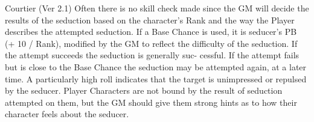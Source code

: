\begin{Chapter}{Courtier (Ver 2.1)}
Often there is no skill check made since the GM will decide the
results of the seduction based on the character’s Rank and the way the
Player describes the attempted seduction. If a Base Chance is used, it
is seducer’s PB (+ 10 / Rank), modified by the GM to reflect the
difficulty of the seduction. If the attempt succeeds the seduction is
generally suc- cessful. If the attempt fails but is close to the Base
Chance the seduction may be attempted again, at a later time. A
particularly high roll indicates that the target is unimpressed or
repulsed by the seducer.  Player Characters are not bound by the
result of seduction attempted on them, but the GM should give them
strong hints as to how their character feels about the seducer.

\end{Chapter}
